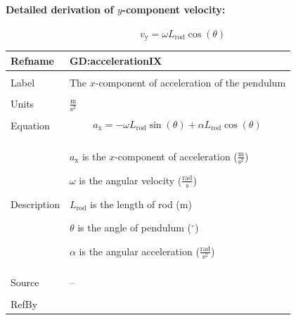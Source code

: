 \documentclass[12pt]{article}
\begin{document}
\paragraph{Detailed derivation of $y$-component velocity:}
\label{GD:velocityIYDeriv}
\begin{displaymath}
{v_{\text{y}}}=ω {L_{\text{rod}}} \cos\left(θ\right)
\end{displaymath}
\vspace{\baselineskip}
\noindent
\begin{minipage}{\textwidth}
\begin{tabular}{>{\raggedright}p{}>{\raggedright\arraybackslash}p{}}
\toprule \textbf{Refname} & \textbf{GD:accelerationIX}
\label{GD:accelerationIX}
\\ \midrule \\
Label & The $x$-component of acceleration of the pendulum
        
\\ \midrule \\
Units & $\frac{\text{m}}{\text{s}^{2}}$
        
\\ \midrule \\
Equation & \begin{displaymath}
           {a_{\text{x}}}=-ω {L_{\text{rod}}} \sin\left(θ\right)+α {L_{\text{rod}}} \cos\left(θ\right)
           \end{displaymath}
\\ \midrule \\
Description & \begin{symbDescription}
              \item{${a_{\text{x}}}$ is the $x$-component of acceleration ($\frac{\text{m}}{\text{s}^{2}}$)}
              \item{$ω$ is the angular velocity ($\frac{\text{rad}}{\text{s}}$)}
              \item{${L_{\text{rod}}}$ is the length of rod (${\text{m}}$)}
              \item{$θ$ is the angle of pendulum (${{}^{\circ}}$)}
              \item{$α$ is the angular acceleration ($\frac{\text{rad}}{\text{s}^{2}}$)}
              \end{symbDescription}
\\ \midrule \\
Source & --
         
\\ \midrule \\
RefBy & 
\\ \bottomrule
\end{tabular}
\end{minipage}
\end{document}

